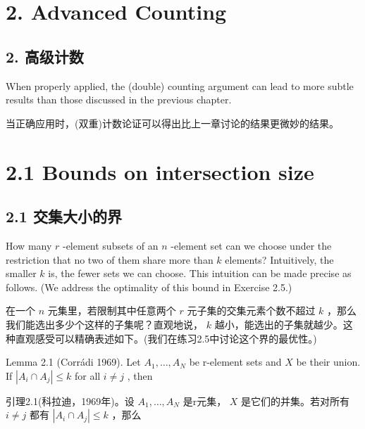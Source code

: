 \documentclass[10pt]{article}
\begin{document}
\section*{2. Advanced Counting}

\begin{tcolorbox}\relax
\section*{2. 高级计数}
\end{tcolorbox}

When properly applied, the (double) counting argument can lead to more subtle results than those discussed in the previous chapter.

\begin{tcolorbox}\relax
当正确应用时，(双重)计数论证可以得出比上一章讨论的结果更微妙的结果。
\end{tcolorbox}

\section*{2.1 Bounds on intersection size}

\begin{tcolorbox}\relax
\section*{2.1 交集大小的界}
\end{tcolorbox}

How many \(r\) -element subsets of an \(n\) -element set can we choose under the restriction that no two of them share more than \(k\) elements? Intuitively, the smaller \(k\) is, the fewer sets we can choose. This intuition can be made precise as follows. (We address the optimality of this bound in Exercise 2.5.)

\begin{tcolorbox}\relax
在一个 \(n\) 元集里，若限制其中任意两个 \(r\) 元子集的交集元素个数不超过 \(k\) ，那么我们能选出多少个这样的子集呢？直观地说， \(k\) 越小，能选出的子集就越少。这种直观感受可以精确表述如下。(我们在练习2.5中讨论这个界的最优性。)
\end{tcolorbox}

Lemma 2.1 (Corrádi 1969). Let \({A}_{1},\ldots ,{A}_{N}\) be r-element sets and \(X\) be their union. If \(\left| {{A}_{i} \cap  {A}_{j}}\right|  \leq  k\) for all \(i \neq  j\) , then

\begin{tcolorbox}\relax
引理2.1(科拉迪，1969年)。设 \({A}_{1},\ldots ,{A}_{N}\) 是r元集， \(X\) 是它们的并集。若对所有 \(i \neq  j\) 都有 \(\left| {{A}_{i} \cap  {A}_{j}}\right|  \leq  k\) ，那么
\end{tcolorbox}
\end{document}
